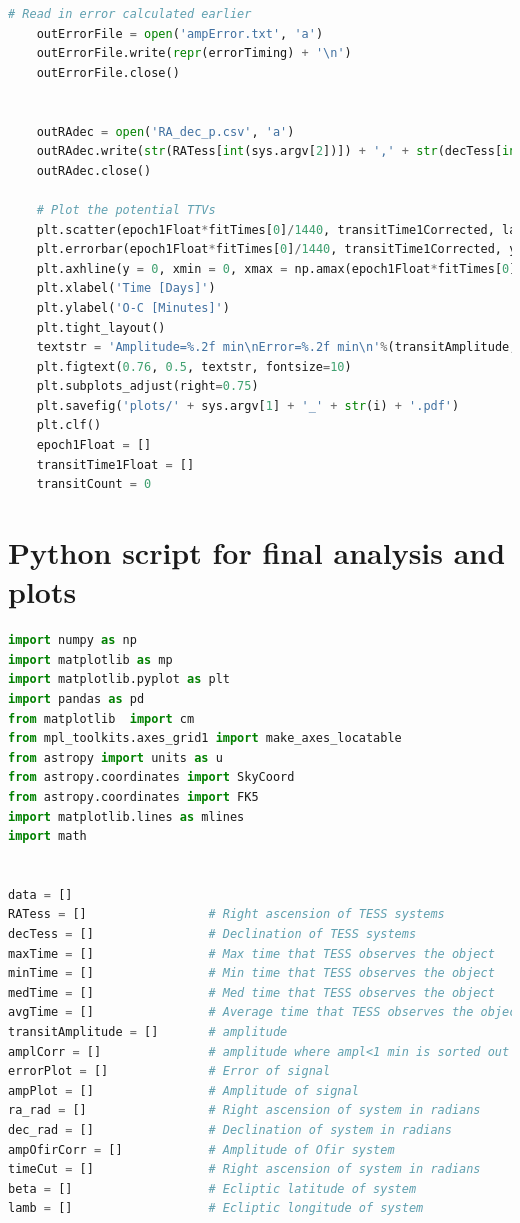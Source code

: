 \documentclass[12pt]{report}
\begin{document}
\begin{appendix}
\begin{lstlisting}[language=Python]
	# Read in error calculated earlier
	outErrorFile = open('ampError.txt', 'a')
	outErrorFile.write(repr(errorTiming) + '\n')
	outErrorFile.close()
	
	
	outRAdec = open('RA_dec_p.csv', 'a')
	outRAdec.write(str(RATess[int(sys.argv[2])]) + ',' + str(decTess[int(sys.argv[2])]))
	outRAdec.close()
	
	# Plot the potential TTVs
	plt.scatter(epoch1Float*fitTimes[0]/1440, transitTime1Corrected, label='Transit Time')
	plt.errorbar(epoch1Float*fitTimes[0]/1440, transitTime1Corrected, yerr = errorTiming, linestyle="None")
	plt.axhline(y = 0, xmin = 0, xmax = np.amax(epoch1Float*fitTimes[0]/1440), c = 'black')
	plt.xlabel('Time [Days]')
	plt.ylabel('O-C [Minutes]')
	plt.tight_layout()
	textstr = 'Amplitude=%.2f min\nError=%.2f min\n'%(transitAmplitude, errorTiming)
	plt.figtext(0.76, 0.5, textstr, fontsize=10)
	plt.subplots_adjust(right=0.75)
	plt.savefig('plots/' + sys.argv[1] + '_' + str(i) + '.pdf')
	plt.clf()
	epoch1Float = []
	transitTime1Float = []
	transitCount = 0

\end{lstlisting}
\chapter{Python script for final analysis and plots}
\begin{lstlisting}[language=Python]
import numpy as np
import matplotlib as mp
import matplotlib.pyplot as plt
import pandas as pd
from matplotlib  import cm
from mpl_toolkits.axes_grid1 import make_axes_locatable
from astropy import units as u
from astropy.coordinates import SkyCoord
from astropy.coordinates import FK5
import matplotlib.lines as mlines
import math


data = []
RATess = []					# Right ascension of TESS systems
decTess = []				# Declination of TESS systems
maxTime = []				# Max time that TESS observes the object
minTime = []				# Min time that TESS observes the object
medTime = []				# Med time that TESS observes the object
avgTime = []				# Average time that TESS observes the object
transitAmplitude = []		# amplitude
amplCorr = []				# amplitude where ampl<1 min is sorted out
errorPlot = []				# Error of signal
ampPlot = []				# Amplitude of signal
ra_rad = []					# Right ascension of system in radians
dec_rad = []				# Declination of system in radians
ampOfirCorr = []			# Amplitude of Ofir system
timeCut = []				# Right ascension of system in radians
beta = []					# Ecliptic latitude of system
lamb = []					# Ecliptic longitude of system



\end{lstlisting}
\end{appendix}
\end{document}
